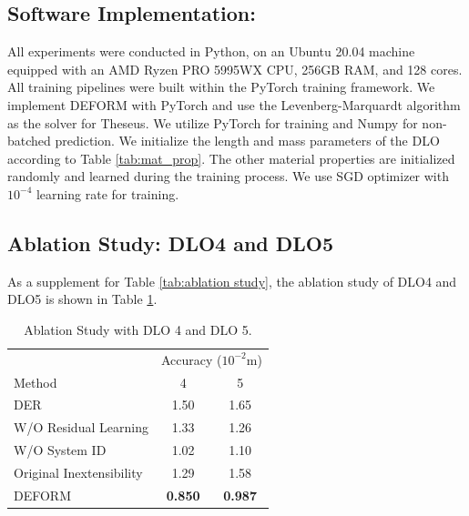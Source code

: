 \subsection{Software Implementation:}
All experiments were conducted in Python, on an Ubuntu 20.04 machine equipped with an AMD Ryzen PRO 5995WX CPU, 256GB RAM, and 128 cores. 
All training pipelines were built within the PyTorch training framework. 
We implement DEFORM with PyTorch and use the Levenberg-Marquardt algorithm as the solver for Theseus.
We utilize PyTorch for training and  Numpy for non-batched prediction. 
We initialize the length and mass parameters of the DLO according to Table \ref{tab:mat_prop}. 
The other material properties are initialized randomly and learned during the training process.
We use SGD optimizer with $10^{-4}$ learning rate for training.
\subsection{Ablation Study: DLO4 and DLO5}
\label{appendix:sec:addablation1}
As a supplement for Table \ref{tab:ablation study}, the ablation study of DLO4 and DLO5 is shown in Table \ref{tab:ablation study additional DLOs}.
\begin{table}
\centering
\vspace*{-0.4cm}
\caption{Ablation Study with DLO 4 and DLO 5.}
\begin{tabular}{l|cc}
        \toprule
        & \multicolumn{2}{c}{Accuracy ($10^{-2}$m)} \\         
        Method & 4 & 5   \\
        \midrule
        DER & 1.50 & 1.65   \\ 
        W/O Residual Learning & 1.33 & 1.26    \\
        W/O System ID & 1.02 & 1.10 \\ 
        Original Inextensibility & 1.29  & 1.58   \\
        DEFORM & \textbf{0.850} & \textbf{0.987}  \\
        \bottomrule
        \end{tabular}
        \vspace*{-0.3cm}
        \label{tab:ablation study additional DLOs}
\end{table}
